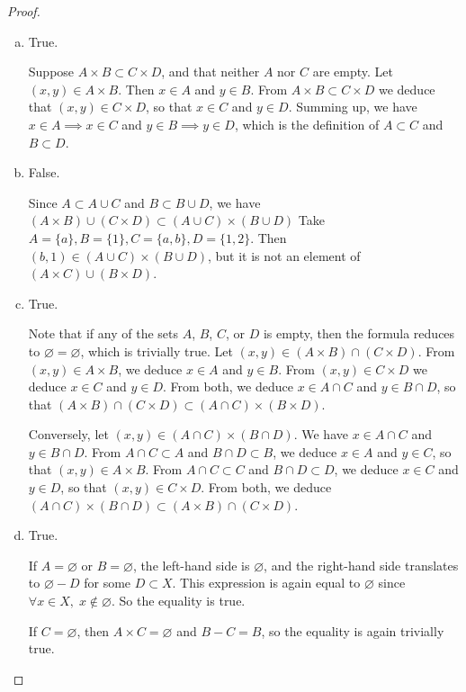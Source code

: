 \documentclass[11pt,a4paper,twoside]{article}
\theoremstyle{definition}
\begin{document}
\begin{proof}
\begin{enumerate}[(a)]
\item True.

  Suppose $A \times B \subset C \times D$, and that neither $A$ nor $C$ are empty. Let $(x, y) \in A \times B$. Then $x \in A$ and $y \in B$.
  From $A \times B \subset C \times D$ we deduce that $(x, y) \in C \times D$, so that $x \in C$ and $y \in D$. Summing up, we have
  $x \in A \implies x \in C$ and $y \in B \implies y \in D$, which is the definition of $A \subset C$ and $B \subset D$.

\item False.

  Since $A \subset A \cup C$ and $B \subset B \cup D$, we have $(A \times B) \cup (C \times D) \subset (A \cup C) \times (B \cup D)$
  Take $A = \{ a \}, B = \{ 1 \}, C = \{ a, b \}, D = \{ 1, 2 \}$. Then $(b, 1) \in (A \cup C) \times (B \cup D)$, but it is not an element of $(A \times C) \cup (B \times D)$.

\item True.

  Note that if any of the sets $A$, $B$, $C$, or $D$ is empty, then the formula reduces to $\varnothing = \varnothing$, which is trivially true.
  Let $(x, y) \in (A \times B) \cap (C \times D)$. From $(x, y) \in A \times B$, we deduce $x \in A$ and $y \in B$. From $(x, y) \in C \times D$ we deduce $x \in C$ and $y \in D$.
  From both, we deduce $x \in A \cap C$ and $y \in B \cap D$, so that $(A \times B) \cap (C \times D) \subset (A \cap C) \times (B \times D)$.

  Conversely, let $(x, y) \in (A \cap C) \times (B \cap D)$. We have $x \in A \cap C$ and $y \in B \cap D$. From $A \cap C \subset A$ and $B \cap D \subset B$, we deduce $x \in A$ and $y \in C$,
  so that $(x, y) \in A \times B$. From $A \cap C \subset C$ and $B \cap D \subset D$, we deduce $x \in C$ and $y \in D$, so that $(x, y) \in C \times D$.
  From both, we deduce $(A \cap C) \times (B \cap D) \subset (A \times B) \cap (C \times D)$.

\item True.

  If $A = \varnothing$ or $B = \varnothing$, the left-hand side is $\varnothing$, and the right-hand side translates to $\varnothing - D$ for some $D \subset X$.
  This expression is again equal to $\varnothing$ since $\forall x \in X,\; x \notin \varnothing$. So the equality is true.

  If $C = \varnothing$, then $A \times C = \varnothing$ and $B - C = B$, so the equality is again trivially true.


\end{enumerate}
\end{proof}
\end{document}
